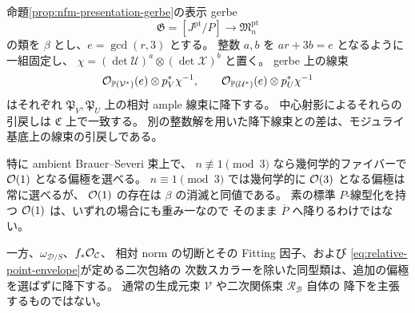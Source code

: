 \begin{proposition}
\label{prop:point-polarization-descent}
命題\ref{prop:nfm-presentation-gerbe}の表示 gerbe
\[
 \mathfrak G=[J^{\mathrm{pt}}/P]
   \longrightarrow\mathfrak M_n^{\mathrm{pt}}
\]
の類を $\beta$ とし、$e=\gcd(r,3)$ とする。
整数 $a,b$ を $ar+3b=e$ となるように一組固定し、
$\chi=(\det\mathcal U)^a\otimes(\det\mathcal X)^b$ と置く。
gerbe 上の線束
\begin{equation}\label{eq:point-descended-polarization}
 \mathcal O_{\mathbb P(\mathcal V^*)}(e)\otimes p_V^*\chi^{-1},
 \qquad
 \mathcal O_{\mathbb P(\mathcal U^*)}(e)\otimes p_U^*\chi^{-1}
\end{equation}
はそれぞれ $\mathfrak P_V,\mathfrak P_U$ 上の相対 ample 線束に降下する。
中心射影によるそれらの引戻しは $\mathfrak C$ 上で一致する。
別の整数解を用いた降下線束との差は、モジュライ基底上の線束の引戻しである。

特に ambient Brauer--Severi 束上で、
$n\not\equiv1\pmod3$ なら幾何学的ファイバーで
$\mathcal O(1)$ となる偏極を選べる。
$n\equiv1\pmod3$ では幾何学的に $\mathcal O(3)$ となる偏極は常に選べるが、
$\mathcal O(1)$ の存在は $\beta$ の消滅と同値である。
素の標準 $P$-線型化を持つ $\mathcal O(1)$ は、いずれの場合にも重み一なので
そのまま $\overline P$ へ降りるわけではない。

一方、$\omega_{\mathcal D/S}$、$f_*\mathcal O_{\mathcal C}$、
相対 norm の切断とその Fitting 因子、および
\eqref{eq:relative-point-envelope}が定める二次包絡の
次数スカラーを除いた同型類は、追加の偏極を選ばずに降下する。
通常の生成元束 $\mathcal V$ や二次関係束 $\mathcal R_{\mathcal B}$ 自体の
降下を主張するものではない。
\end{proposition}

